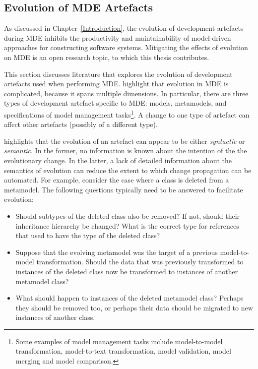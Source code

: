 \subsection{Evolution of MDE Artefacts}
\label{subsec:mde_evo}
As discussed in Chapter~\ref{Introduction}, the evolution of development artefacts during MDE inhibits the productivity and maintainability of model-driven approaches for constructing software systems. Mitigating the effects of evolution on MDE is an open research topic, to which this thesis contributes.

This section discusses literature that explores the evolution of development artefacts used when performing MDE. \cite{deursen07mdse} highlight that evolution in MDE is complicated, because it spans multiple dimensions. In particular, there are three types of development artefact specific to MDE: models, metamodels, and specifications of model management tasks\footnote{Some examples of model management tasks include model-to-model transformation, model-to-text transformation, model validation, model merging and model comparison.}. A change to one type of artefact can affect other artefacts (possibly of a different type). 

\cite{sprinkle04domain} highlights that the evolution of an artefact can appear to be either \emph{syntactic} or \emph{semantic}. In the former, no information is known about the intention of the the evolutionary change. In the latter, a lack of detailed information about the semantics of evolution can reduce the extent to which change propagation can be automated. For example, consider the case where a class is deleted from a metamodel. The following questions typically need to be answered to facilitate evolution:
 \begin{itemize}
  \item Should subtypes of the deleted class also be removed? If not, should their inheritance hierarchy be changed? What is the correct type for references that used to have the type of the deleted class?
  \item Suppose that the evolving metamodel was the target of a previous model-to-model transformation. Should the data that was previously transformed to instances of the deleted class now be transformed to instances of another metamodel class?
  \item What should happen to instances of the deleted metamodel class? Perhaps they should be removed too, or perhaps their data should be migrated to new instances of another class.
 \end{itemize}

